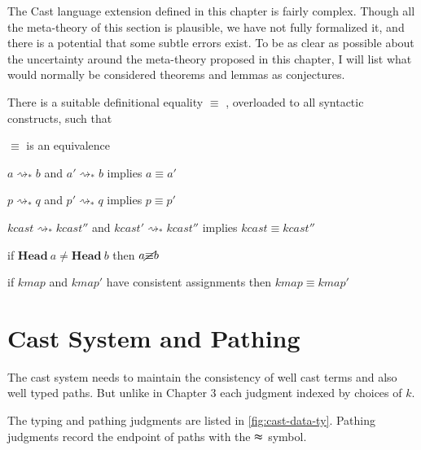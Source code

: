 The Cast language extension defined in this chapter is fairly complex.
Though all the meta-theory of this section is plausible, we have not
fully formalized it, and there is a potential that some subtle errors
exist. To be as clear as possible about the uncertainty around the
meta-theory proposed in this chapter, I will list what would normally
be considered theorems and lemmas as conjectures. 
\begin{conjecture}
There is a suitable definitional equality $\equiv$ , overloaded to
all syntactic constructs, such that

$\equiv$ is an equivalence

$a\rightsquigarrow_{*}b$ and $a'\rightsquigarrow_{*}b$ implies $a\equiv a'$

$p\rightsquigarrow_{*}q$ and $p'\rightsquigarrow_{*}q$ implies $p\equiv p'$

$kcast\rightsquigarrow_{*}kcast''$ and $kcast'\rightsquigarrow_{*}kcast''$
implies $kcast\equiv kcast''$

if $\mathbf{Head\ }a\neq\mathbf{Head}\ b$ then $a\cancel{\equiv}b$

if \textup{$kmap$ and $kmap'$ have consistent assignments then}
$kmap\equiv kmap'$

\end{conjecture}


\section{Cast System and Pathing}

The cast system needs to maintain the consistency of well cast terms
and also well typed paths. But unlike in Chapter 3 each judgment indexed
by choices of $k$.

The typing and pathing judgments are listed in \ref{fig:cast-data-ty}.
Pathing judgments record the endpoint of paths with the $\thickapprox$
symbol. 

